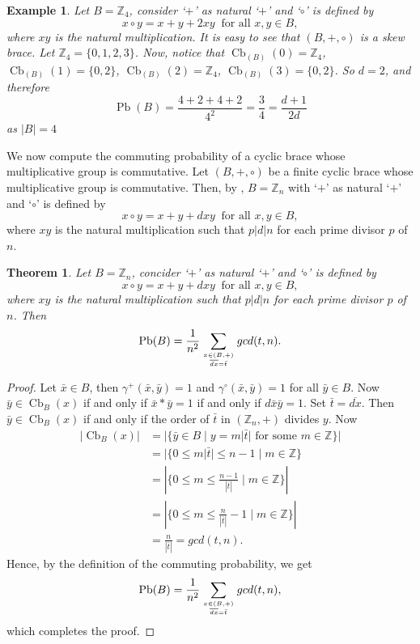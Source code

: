 \documentclass[oneside]{amsart}
\numberwithin{equation}{section}
\theoremstyle{plain}
\newtheorem{exa}[equation]{Example}
\newtheorem{thm}[equation]{Theorem}
\theoremstyle{definition}
\newcommand{\Cb}{\operatorname{Cb} }
\newcommand{\Pb}{\operatorname{Pb} }
\begin{document}
\begin{exa}\label{3/4}
      Let $B=\mathbb{Z}_4$, consider `$+$' as natural `$+$' and `$\circ$' is defined by
      $$x\circ y=x+y+2xy ~\mbox{ for all } x,y \in B,$$ 
      where $xy$ is the natural multiplication. 
      It is easy to see that $(B, +, \circ)$ is a skew brace. Let $\mathbb{Z}_4= \{0, 1, 2, 3\}$. Now, notice that 
      $\Cb_{(B)}(0)=\mathbb{Z}_4$, $\Cb_{(B)}(1)=\{0,2\}$, $\Cb_{(B)}(2)=\mathbb{Z}_4$, $\Cb_{(B)}(3)=\{0,2\}$.
      So $d=2$, and therefore 
      $$\Pb(B)=\frac{4+2+4+2}{4^2}=\frac{3}{4}=\frac{d+1}{2d}$$
      as $|B|=4$
\end{exa}
We now compute the commuting probability of a cyclic brace whose multiplicative group is commutative. Let $(B,+,\circ)$ be a finite cyclic brace whose multiplicative group is commutative. Then, by  \cite[Theorem 1]{WR07}, $B=\mathbb{Z}_n$ with `$+$' as natural `$+$' and `$\circ$' is defined by
$$x\circ y=x+y+dxy ~\mbox{ for all } x,y \in B,$$ 
where $xy$ is the natural multiplication such that $p|d|n$ for each prime divisor $p$ of $n$. 

\begin{thm}
    Let $B=\mathbb{Z}_n$, concider `$+$' as natural `$+$' and `$\circ$' is defined by
    $$x\circ y=x+y+dxy ~\mbox{ for all } x,y \in B,$$ 
    where $xy$ is the natural multiplication such that $p|d|n$ for each prime divisor $p$ of $n$. Then 
    \[\Pb(B)=\frac{1}{n^2}\sum_{{x \in (B, +)} \atop{\overline{dx}=\bar{t}}} gcd(t,n).\]
\end{thm}
\begin{proof}
    Let $\bar{x}\in B$, then $\gamma^+(\bar{x},\bar{y})=1$ and $\gamma^{\circ}(\bar{x},\bar{y})=1$ for all $\bar{y}\in B$. Now $\bar{y}\in \Cb_B(x)$ if and only if $\bar{x}\ast\bar{y}=1$ if and only if $d\bar{x}\bar{y}=1$. Set $\bar{t} = \overline{dx}$. Then  $\bar{y}\in \Cb_B(x)$ if and only if  the order of $\bar{t}$ in $(\mathbb{Z}_n,+)$ divides $y$.  Now 
    \begin{align*}
        |\Cb_B{(x)}|&=|\{\bar{y}\in B \mid y = m |\bar{t}|  \text{ for some } m\in\mathbb{Z} \}|\\
                  &=|\{0\leqslant m|\bar{t}|\leqslant n-1 \mid  m \in \mathbb{Z}\}\\
                  &=|\{0\leqslant m\leqslant \frac{n-1}{|\bar{t}|}  \mid  m \in \mathbb{Z} \}|  \\
                  &=|\{0\leqslant m\leqslant \frac{n}{|\bar{t}|}-1  \mid  m \in \mathbb{Z}\}|  \\
                  &= \frac{n}{|\bar{t}|}  = gcd(t, n).
    \end{align*}
   Hence, by the definition of the commuting probability, we get
    \[\Pb(B)=\frac{1}{n^2}\sum_{{x \in (B, +)} \atop{\overline{dx}=\bar{t}}} gcd(t,n),\]
    which completes the proof.
\end{proof}
\end{document}
